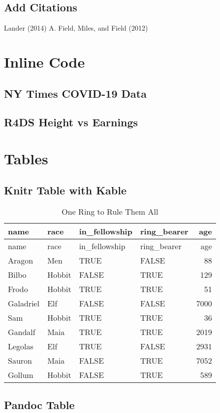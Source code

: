 \documentclass[]{article}
\begin{document}
\subsection{Add Citations}\label{add-citations}

Lander (2014) A. Field, Miles, and Field (2012)

\section{Inline Code}\label{inline-code}

\subsection{NY Times COVID-19 Data}\label{ny-times-covid-19-data}

\subsection{R4DS Height vs Earnings}\label{r4ds-height-vs-earnings}

\section{Tables}\label{tables}

\subsection{Knitr Table with Kable}\label{knitr-table-with-kable}

\begin{longtable}[]{@{}llllr@{}}
\caption{One Ring to Rule Them All}\tabularnewline
\toprule
name & race & in\_fellowship & ring\_bearer & age\tabularnewline
\midrule
\endfirsthead
\toprule
name & race & in\_fellowship & ring\_bearer & age\tabularnewline
\midrule
\endhead
Aragon & Men & TRUE & FALSE & 88\tabularnewline
Bilbo & Hobbit & FALSE & TRUE & 129\tabularnewline
Frodo & Hobbit & TRUE & TRUE & 51\tabularnewline
Galadriel & Elf & FALSE & FALSE & 7000\tabularnewline
Sam & Hobbit & TRUE & TRUE & 36\tabularnewline
Gandalf & Maia & TRUE & TRUE & 2019\tabularnewline
Legolas & Elf & TRUE & FALSE & 2931\tabularnewline
Sauron & Maia & FALSE & TRUE & 7052\tabularnewline
Gollum & Hobbit & FALSE & TRUE & 589\tabularnewline
\bottomrule
\end{longtable}

\subsection{Pandoc Table}\label{pandoc-table}
\end{document}
